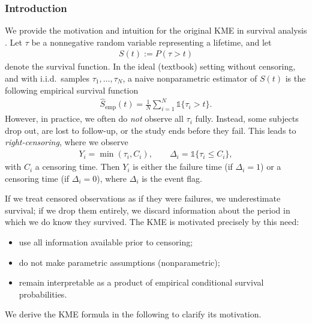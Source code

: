 \documentclass{article}
\theoremstyle{plain}
\theoremstyle{definition}
\theoremstyle{remark}
\def\mbone{\mathds{1}}
\begin{document}
\subsubsection{Introduction}
We provide the motivation and intuition for the original KME in survival analysis \cite{kaplan1958nonparametric_KME_org, kleinbaum1996survival}.
Let $\tau$ be a nonnegative random variable representing a lifetime, and let
\begin{align}
S(t) := P(\tau > t)
\end{align}
denote the survival function. 
In the ideal (textbook) setting without censoring, and with i.i.d.\ samples $\tau_1,\dots,\tau_N$, a naive nonparametric estimator of $S(t)$ is the following empirical survival function
\begin{align}
    \hat{S}_\mathrm{emp} (t) 
    = \frac{1}{N} \sum_{i=1}^N \mbone\{\tau_i > t\}.
\end{align}
However, in practice, we often do \emph{not} observe all $\tau_i$ fully. Instead, some subjects drop out, are lost to follow-up, or the study ends before they fail. This leads to \emph{right-censoring}, where we observe
\begin{align}
    Y_i = \min(\tau_i, C_i), 
    \qquad 
    \Delta_i = \mbone\{\tau_i \le C_i\},
\end{align}
with $C_i$ a censoring time. Then $Y_i$ is either the failure time (if $\Delta_i=1$) or a censoring time (if $\Delta_i=0$), where $\Delta_i$ is the event flag.

If we treat censored observations as if they were failures, we underestimate survival; if we drop them entirely, we discard information about the period in which we do know they survived. The KME is motivated precisely by this need:
\begin{itemize}
    \item use all information available prior to censoring;
    \item do not make parametric assumptions (nonparametric);
    \item remain interpretable as a product of empirical conditional survival probabilities.
\end{itemize}

We derive the KME formula in the following to clarify its motivation.

\end{document}
